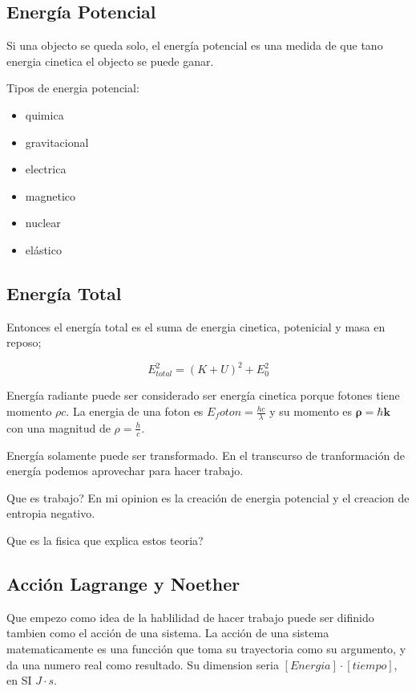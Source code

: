 \documentclass[11pt]{article}
\begin{document}
\subsection{Energ\'ia Potencial}

	Si una objecto se queda solo, el energ\'ia potencial es una medida de que tano energia cinetica el objecto se puede ganar.

Tipos de energia potencial:

\begin{itemize}
	\item quimica
	\item gravitacional
	\item electrica
	\item magnetico
	\item nuclear
	\item el\'astico
\end{itemize}

\subsection{Energ\'ia Total}

	Entonces el energ\'ia total es el suma de energia cinetica, potenicial y masa en reposo;

\begin{equation}
	E_{total}^2=(K+U)^2+E_0^2
\end{equation}

Energ\'ia radiante puede ser considerado ser energ\'ia cinetica porque fotones tiene momento $\rho c$. La energia de una foton es $E_foton=\frac {h c}{\lambda}$ y su momento es $\boldsymbol{\rho}=\hbar \boldsymbol{k}$ con una magnitud de $\rho=\frac{h}{c}$.

Energ\'ia solamente puede ser transformado. En el transcurso de tranformaci\'on de energ\'ia podemos aprovechar para hacer trabajo.

Que es trabajo? En mi opinion es la creaci\'on de energia potencial y el creacion de entropia negativo.

Que es la fisica que explica estos teoria?

\subsection{Acci\'on Lagrange y Noether}

	Que empezo como idea de la hablilidad de hacer trabajo puede ser difinido tambien como el acci\'on de una sistema. La acci\'on de una sistema matematicamente es una funcci\'on que toma su trayectoria como su argumento, y da una numero real como resultado. Su dimension seria $[Energia] \cdot [tiempo]$, en SI $J \cdot s$.
	
\end{document}
